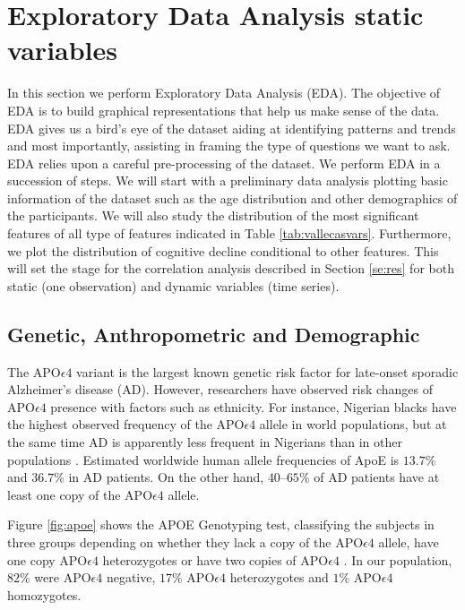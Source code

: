 \documentclass[11pt]{article}
\theoremstyle{definition}
\theoremstyle{remark}
\begin{document}

\section{Exploratory Data Analysis static variables}
\label{sse:eda}
In this section we perform Exploratory Data Analysis (EDA). The objective of EDA is to build graphical representations that help us make sense of the data. EDA gives us a bird's eye of the dataset aiding at identifying patterns and trends and most importantly, assisting in framing the type of questions we want to ask.
EDA relies upon a careful pre-processing of the dataset. We perform EDA in a succession of steps. We will start with a preliminary data analysis plotting basic information of the dataset such as the age distribution and other demographics of the participants. 
We will also study the distribution of the most significant features of all type of features indicated in Table \ref{tab:vallecasvars}. Furthermore, we plot the distribution of cognitive decline conditional to other features. This will set the stage for the correlation analysis described in Section \ref{se:res} for both static (one observation) and dynamic variables (time series).


\subsection{Genetic, Anthropometric and Demographic}
\label{ssse:ant}
The APO$\epsilon4$ variant is the largest known genetic risk factor for late-onset sporadic Alzheimer's disease (AD). However, researchers have observed risk changes of APO$\epsilon4$ presence with factors such as ethnicity. For instance, Nigerian blacks have the highest observed frequency of the APO$\epsilon4$ allele in world populations, but at the same time AD is apparently less frequent in Nigerians than in other populations \cite{sepehrnia1989genetic}.
Estimated worldwide human allele frequencies of ApoE is $13.7\%$ and $36.7\%$ in AD patients. On the other hand, $40–65\%$ of AD patients have at least one copy of the APO$\epsilon4$ allele.

Figure \ref{fig:apoe} shows the APOE Genotyping test, classifying the subjects in three groups depending on whether they lack a copy of the APO$\epsilon4$ allele, have one copy APO$\epsilon4$ heterozygotes or have two copies of APO$\epsilon4$ \cite{farrer1997effects}. In our population, $82\%$ were APO$\epsilon4$ negative, $17\%$ APO$\epsilon4$ heterozygotes and $1\%$ APO$\epsilon4$ homozygotes. 
\end{document}
